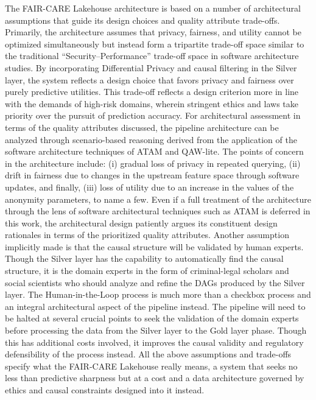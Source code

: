 The FAIR-CARE Lakehouse architecture is based on a number of architectural assumptions that guide its design choices and quality attribute trade-offs. Primarily, the architecture assumes that privacy, fairness, and utility cannot be optimized simultaneously but instead form a tripartite trade-off space similar to the traditional “Security–Performance” trade-off space in software architecture studies. By incorporating Differential Privacy and causal filtering in the Silver layer, the system reflects a design choice that favors privacy and fairness over purely predictive utilities. This trade-off reflects a design criterion more in line with the demands of high-risk domains, wherein stringent ethics and laws take priority over the pursuit of prediction accuracy. For architectural assessment in terms of the quality attributes discussed, the pipeline architecture can be analyzed through scenario-based reasoning derived from the application of the software architecture techniques of ATAM and QAW-lite. The points of concern in the architecture include: (i) gradual loss of privacy in repeated querying, (ii) drift in fairness due to changes in the upstream feature space through software updates, and finally, (iii) loss of utility due to an increase in the values of the anonymity parameters, to name a few.
Even if a full treatment of the architecture through the lens of software architectural techniques such as ATAM is deferred in this work, the architectural design patiently argues its constituent design rationales in terms of the prioritized quality attributes. Another assumption implicitly made is that the causal structure will be validated by human experts. Though the Silver layer has the capability to automatically find the causal structure, it is the domain experts in the form of criminal-legal scholars and social scientists who should analyze and refine the DAGs produced by the Silver layer. The Human-in-the-Loop process is much more than a checkbox process and an integral architectural aspect of the pipeline instead. The pipeline will need to be halted at several crucial points to seek the validation of the domain experts before processing the data from the Silver layer to the Gold layer phase. Though this has additional costs involved, it improves the causal validity and regulatory defensibility of the process instead. All the above assumptions and trade-offs specify what the FAIR-CARE Lakehouse really means, a system that seeks no less than predictive sharpness but at a cost and a data architecture governed by ethics and causal constraints designed into it instead.

